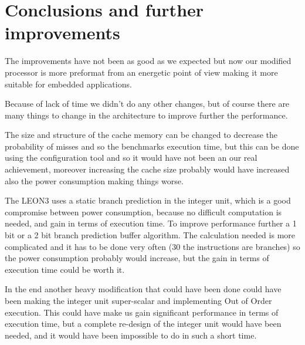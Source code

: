 \section{Conclusions and further improvements}

The improvements have not been as good as we expected but now our modified processor is more
preformat from an energetic point of view making it more suitable for embedded applications.

Because of lack of time we didn't do any other changes, but of course there are many things to
change in the architecture to improve further the performance.

The size and structure of the cache memory can be changed to decrease the probability of misses
and so the benchmarks execution time, but this can be done using the configuration tool and so it
would have not been an our real achievement, moreover increasing the cache size probably would
have increased also the power consumption making things worse.

The LEON3 uses a static branch prediction in the integer unit, which is a good compromise
between power consumption, because no difficult computation is needed, and gain in terms of
execution time. To improve performance further a 1 bit or a 2 bit branch prediction buffer
algorithm. The calculation needed is more complicated and it has to be done very often (30%
the instructions are branches) so the power consumption probably would increase, but the gain in
terms of execution time could be worth it.

In the end another heavy modification that could have been done could have been making the
integer unit super-scalar and implementing Out of Order execution. This could have make us gain
significant performance in terms of execution time, but a complete re-design of the integer unit
would have been needed, and it would have been impossible to do in such a short time.